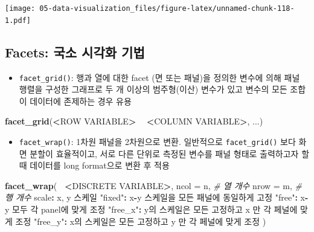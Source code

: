 \documentclass[
  11pt,
]{krantz}
\newenvironment{Shaded}{\begin{snugshade}}{\end{snugshade}}
\newcommand{\CommentTok}[1]{\textcolor[rgb]{0.37,0.37,0.37}{\textit{#1}}}
\newcommand{\DataTypeTok}[1]{\textcolor[rgb]{0.27,0.27,0.27}{#1}}
\newcommand{\ErrorTok}[1]{\textcolor[rgb]{0.14,0.14,0.14}{\textbf{#1}}}
\newcommand{\KeywordTok}[1]{\textcolor[rgb]{0.27,0.27,0.27}{\textbf{#1}}}
\newcommand{\NormalTok}[1]{#1}
\newcommand{\OperatorTok}[1]{\textcolor[rgb]{0.43,0.43,0.43}{\textbf{#1}}}
\newcommand{\StringTok}[1]{\textcolor[rgb]{0.5,0.5,0.5}{#1}}
\providecommand{\tightlist}{%
  \setlength{\itemsep}{0pt}\setlength{\parskip}{0pt}}
\begin{document}
\normalsize

\footnotesize

\texttt{[image: 05-data-visualization\_files/figure-latex/unnamed-chunk-118-1.pdf]}

\normalsize

\hypertarget{facets-uxad6duxc18c-uxc2dcuxac01uxd654-uxae30uxbc95}{%
\subsection{Facets: 국소 시각화 기법}\label{facets-uxad6duxc18c-uxc2dcuxac01uxd654-uxae30uxbc95}}

\begin{itemize}
\tightlist
\item
  \texttt{facet\_grid()}: 행과 열에 대한 facet (면 또는 패널)을 정의한 변수에 의해 패널 행렬을 구성한 그래프로 두 개 이상의 범주형(이산) 변수가 있고 변수의 모든 조합이 데이터에 존제하는 경우 유용
\end{itemize}

\footnotesize

\begin{Shaded}
\begin{Highlighting}[]
\KeywordTok{facet_grid}\NormalTok{(}\OperatorTok{<}\NormalTok{ROW VARIABLE}\OperatorTok{>}\StringTok{ }\ErrorTok{~}\StringTok{ }\ErrorTok{<}\NormalTok{COLUMN VARIABLE}\OperatorTok{>}\NormalTok{, ...)}
\end{Highlighting}
\end{Shaded}

\normalsize

\begin{itemize}
\tightlist
\item
  \texttt{facet\_wrap()}: 1차원 패널을 2차원으로 변환. 일반적으로 \texttt{facet\_grid()} 보다 화면 분할이 효율적이고, 서로 다른 단위로 측정된 변수를 패널 형태로 출력하고자 할 때 데이터를 long format으로 변환 후 적용
\end{itemize}

\footnotesize

\begin{Shaded}
\begin{Highlighting}[]
\KeywordTok{facet_wrap}\NormalTok{(}\OperatorTok{~}\StringTok{ }\ErrorTok{<}\NormalTok{DISCRETE VARIABLE}\OperatorTok{>}\NormalTok{, }
           \DataTypeTok{ncol =}\NormalTok{ n,  }\CommentTok{# 열 개수}
           \DataTypeTok{nrow =}\NormalTok{ m,  }\CommentTok{# 행 개수}
\NormalTok{           scale}\OperatorTok{:}\StringTok{ }\NormalTok{x, y 스케일}
                  \StringTok{"fixed"}\OperatorTok{:}\StringTok{ }\NormalTok{x}\OperatorTok{-}\NormalTok{y 스케일을 모든 패널에 동일하게 고정}
                  \StringTok{"free"}\OperatorTok{:}\StringTok{ }\NormalTok{x}\OperatorTok{-}\NormalTok{y 모두 각 panel에 맞게 조정}
                  \StringTok{"free_x"}\OperatorTok{:}\StringTok{ }\NormalTok{y의 스케일은 모든 고정하고 x 만 각 페널에 맞게 조정}
                  \StringTok{"free_y"}\OperatorTok{:}\StringTok{ }\NormalTok{x의 스케일은 모든 고정하고 y 만 각 페널에 맞게 조정}
\NormalTok{           )}
\end{Highlighting}
\end{Shaded}
\end{document}
